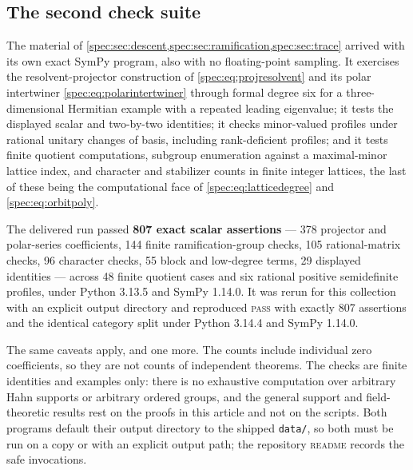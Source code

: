 \documentclass[11pt,a4paper]{article}
\numberwithin{equation}{section}
\theoremstyle{definition}
\theoremstyle{remark}
\begin{document}
\subsection*{The second check suite}
The material of
\cref{spec:sec:descent,spec:sec:ramification,spec:sec:trace} arrived with
its own exact SymPy program, also with no floating-point sampling. It
exercises the resolvent-projector construction of
\eqref{spec:eq:projresolvent} and its polar intertwiner
\eqref{spec:eq:polarintertwiner} through formal degree six for a
three-dimensional Hermitian example with a repeated leading eigenvalue; it
tests the displayed scalar and two-by-two identities; it checks minor-valued
profiles under rational unitary changes of basis, including rank-deficient
profiles; and it tests finite quotient computations, subgroup enumeration
against a maximal-minor lattice index, and character and stabilizer counts
in finite integer lattices, the last of these being the computational face
of \eqref{spec:eq:latticedegree} and \eqref{spec:eq:orbitpoly}.

The delivered run passed \textbf{807 exact scalar assertions} --- 378
projector and polar-series coefficients, 144 finite ramification-group
checks, 105 rational-matrix checks, 96 character checks, 55 block and
low-degree terms, 29 displayed identities --- across 48 finite quotient
cases and six rational positive semidefinite profiles, under Python 3.13.5
and SymPy 1.14.0. It was rerun for this collection with an explicit output
directory and reproduced \textsc{pass} with exactly 807 assertions and the
identical category split under Python 3.14.4 and SymPy 1.14.0.

The same caveats apply, and one more. The counts include individual zero
coefficients, so they are not counts of independent theorems. The checks are
finite identities and examples only: there is no exhaustive computation over
arbitrary Hahn supports or arbitrary ordered groups, and the general support
and field-theoretic results rest on the proofs in this article and not on
the scripts. Both programs default their output directory to the shipped
\texttt{data/}, so both must be run on a copy or with an explicit output
path; the repository \textsc{readme} records the safe invocations.
\end{document}
